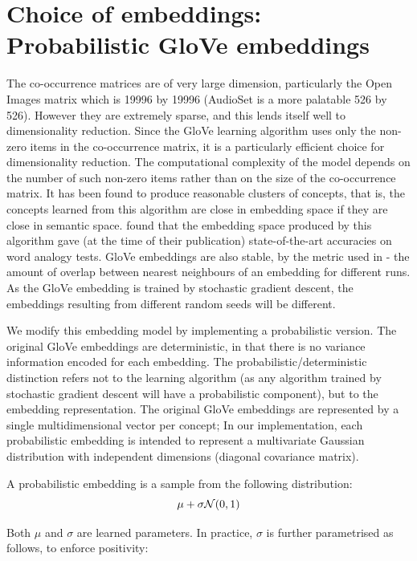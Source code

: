 \section{Choice of embeddings: Probabilistic GloVe embeddings}

The co-occurrence matrices are of very large dimension, particularly the Open Images matrix which is 19996 by 19996 (AudioSet is a more palatable 526 by 526). However they are extremely sparse, and this lends itself well to dimensionality reduction. Since the  GloVe learning algorithm uses only the non-zero items in the co-occurrence matrix, it is a particularly efficient choice for dimensionality reduction. The computational complexity of the model depends on the number of such non-zero items rather than on the size of the co-occurrence matrix. It has been found to produce reasonable clusters of concepts, that is, the concepts learned from this algorithm are close in embedding space if they are close in semantic space. \cite{pennington2014glove} found that the embedding space produced by this algorithm gave (at the time of their publication) state-of-the-art accuracies on word analogy tests. GloVe embeddings are also stable, by the metric used in \cite{WordEmbeddingStability}- the amount of overlap between nearest neighbours of an embedding for different runs. As the GloVe embedding is trained by stochastic gradient descent, the embeddings resulting from different random seeds will be different.

We modify this embedding model by implementing a probabilistic version. The original GloVe embeddings are deterministic, in that there is no variance information encoded for each embedding. The probabilistic/deterministic distinction refers not to the learning algorithm (as any algorithm trained by stochastic gradient descent will have a probabilistic component), but to the embedding representation. The original GloVe embeddings are represented by a single multidimensional vector per concept; In our implementation, each probabilistic embedding is intended to represent a multivariate Gaussian distribution with independent dimensions (diagonal covariance matrix). 

A probabilistic embedding is a sample from the following distribution:
\begin{equation}
    \mu + \sigma \mathcal{N}(0, 1)
\end{equation}

Both $\mu$ and $\sigma$ are learned parameters. In practice, $\sigma$ is further parametrised as follows, to enforce positivity:


